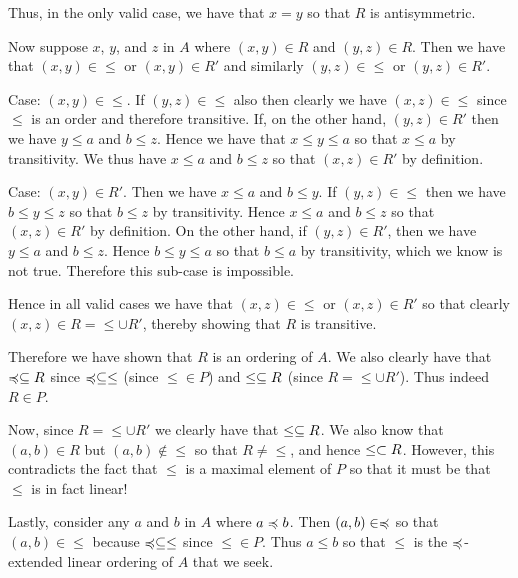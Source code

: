 {{    Thus, in the only valid case, we have that $x=y$ so that $R$ is antisymmetric.

    Now suppose $x$, $y$, and $z$ in $A$ where $(x,y) \in R$ and $(y,z) \in R$.
    Then we have that $(x,y) \in \leq$ or $(x,y) \in R'$ and similarly $(y,z) \in \leq$ or $(y,z) \in R'$.

    Case: $(x,y) \in \leq$.
    If $(y,z) \in \leq$ also then clearly we have $(x,z) \in \leq$ since $\leq$ is an order and therefore transitive.
    If, on the other hand, $(y,z) \in R'$ then we have $y \leq a$ and $b \leq z$.
    Hence we have that $x \leq y \leq a$ so that $x \leq a$ by transitivity.
    We thus have $x \leq a$ and $b \leq z$ so that $(x,z) \in R'$ by definition.

    Case: $(x,y) \in R'$.
    Then we have $x \leq a$ and $b \leq y$.
    If $(y,z) \in \leq$ then we have $b \leq y \leq z$ so that $b \leq z$ by transitivity.
    Hence $x \leq a$ and $b \leq z$ so that $(x,z) \in R'$ by definition.
    On the other hand, if $(y,z) \in R'$, then we have $y \leq a$ and $b \leq z$.
    Hence $b \leq y \leq a$ so that $b \leq a$ by transitivity, which we know is not true.
    Therefore this sub-case is impossible.

    Hence in all valid cases we have that $(x,z) \in \leq$ or $(x,z) \in R'$ so that clearly $(x,z) \in R = \leq \cup R'$, thereby showing that $R$ is transitive.

    Therefore we have shown that $R$ is an ordering of $A$.
    We also clearly have that $\prece \ss R$ since $\prece \ss \leq$ (since $\leq \in P$) and $\leq \ss R$ (since $R = \leq \cup R'$).
    Thus indeed $R \in P$.

    Now, since $R = \leq \cup R'$ we clearly have that $\leq \ss R$.
    We also know that $(a,b) \in R$ but $(a,b) \notin \leq$ so that $R \neq \leq$, and hence $\leq \pss R$.
    However, this contradicts the fact that $\leq$ is a maximal element of $P$ so that it must be that $\leq$ is in fact linear!

    Lastly, consider any $a$ and $b$ in $A$ where $a \prece b$.
    Then $(a,b) \in \prece$ so that $(a,b) \in \leq$ because $\prece \ss \leq$ since $\leq \in P$.
    Thus $a \leq b$ so that $\leq$ is the $\prece$-extended linear ordering of $A$ that we seek.
  }
}
